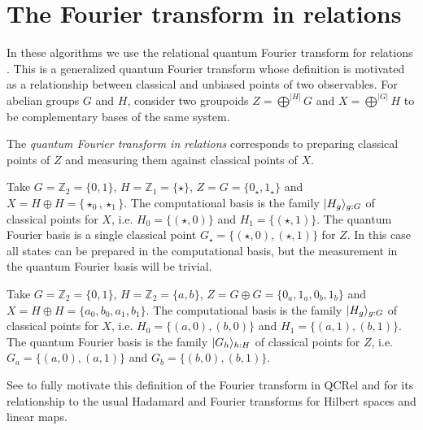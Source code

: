 \section{The Fourier transform in relations}
\label{sec:FT}

In these algorithms we use the relational quantum Fourier transform for relations  . This is a generalized quantum Fourier transform whose definition is motivated as a relationship between classical and unbiased points of two observables.  For abelian groups $G$ and $H$, consider two groupoids $Z=\bigoplus^{|H|}G$ and $X=\bigoplus^{|G|}H$ to be complementary bases of the same system.

\begin{defn}
\label{def:FTRel}
The \emph{quantum Fourier transform in relations} corresponds to preparing classical points of $Z$ and measuring them against classical points of $X$.
\end{defn}

\begin{example}
Take $G=\mathbb{Z}_2=\{0,1\}$, $H=\mathbb{Z}_1=\{\star\}$, $Z = G = \{ 0_\star,1_\star \}$ and $X=H\oplus H = \{ \star_0,\star_1 \}$. The computational basis is the family $| H_g \rangle_{g:G}$ of classical points for $X$, i.e. $H_0 = \{(\star,0)\}$ and $H_1 = \{(\star,1)\}$. The quantum Fourier basis is a single classical point $G_\star = \{(\star,0), (\star,1)\}$ for $Z$. In this case all states can be prepared in the computational basis, but the measurement in the quantum Fourier basis will be trivial.
\end{example}

\begin{example}
Take $G=\mathbb{Z}_2=\{0,1\}$, $H=\mathbb{Z}_2=\{a,b\}$, $Z = G \oplus G = \{ 0_a,1_a,0_b,1_b\}$ and $X= H \oplus H = \{ a_0, b_0, a_1, b_1 \}$. The computational basis is the family $| H_g \rangle_{g:G}$ of classical points for $X$, i.e. $H_0 = \{(a,0),(b,0)\}$ and $H_1 = \{(a,1),(b,1)\}$. The quantum Fourier basis is the family $| G_h \rangle_{h:H}$ of classical points for $Z$, i.e. $G_a = \{(a,0),(a,1)\}$ and $G_b = \{(b,0),(b,1)\}$.
\end{example}

See \cite{strongCompFT} to fully motivate this definition of the Fourier transform in QCRel and for its relationship to the usual Hadamard and Fourier transforms for Hilbert spaces and linear maps.

